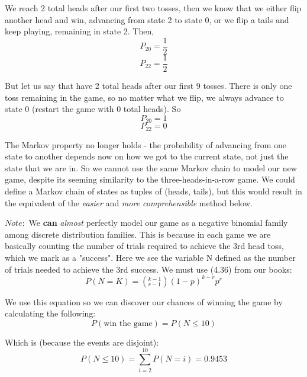 \documentclass{article}
\begin{document}
We reach 2 total heads after our first two tosses, then we know that we either flip another head and win, advancing from state 2 to state 0, or we flip a tails and keep playing, remaining in state 2.  Then,
\begin{equation}
	P_{20} = \frac{1}{2}
\end{equation}
\begin{equation}
	P_{22} = \frac{1}{2}
\end{equation}

But let us say that have 2 total heads after our first 9 tosses.  There is only one toss remaining in the game, so no matter what we flip, we always advance to state 0 (restart the game with 0 total heads).  So
\begin{equation}
	P_{20} = 1
\end{equation}
\begin{equation}
	P_{22} = 0
\end{equation}

The Markov property no longer holds - the probability of advancing from one state to another depends now on how we got to the current state, not just the state that we are in.  So we cannot use the same Markov chain to model our new game, despite its seeming similarity to the three-heads-in-a-row game. We could define a Markov chain of states as tuples of (heads, tails), but this would result in the equivalent of the \textit{easier} and \textit{more comprehensible} method below.


$Note:$ We \textbf{can} \textit{almost} perfectly model our game as a negative binomial family among discrete distribution families.  This is because in each game we are basically counting the number of trials required to achieve the 3rd head toss, which we mark as a "success".  Here we see the variable N defined as the number of trials needed to achieve the 3rd success.  We must use (4.36) from our books:
\begin{equation}
    P(N = K) = ( \text{$_{r-1}^{k-1}$} )(1-p)^{k-r}p^r 
\end{equation}

We use this equation so we can discover our chances of winning the game by calculating the following:
\begin{equation}
    P(\text{win the game}) = P(N \leq 10)
\end{equation}

Which is (because the events are disjoint):
\begin{equation} 
  P(N \leq 10) = \sum_{i=2}^{10}P(N=i) = 0.9453
\end{equation} 
\end{document}
